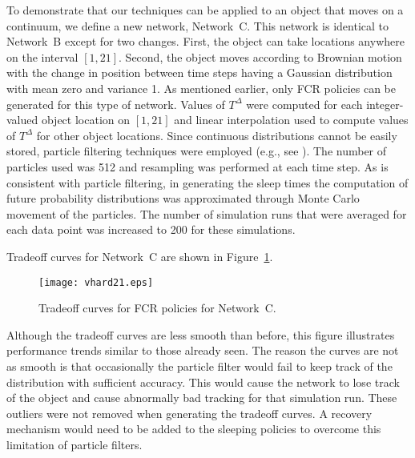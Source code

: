 \documentclass[journal,draftcls,onecolumn,11pt]{IEEEtran}
\begin{document}
To demonstrate that our techniques can be applied to an object that moves on a continuum, we define a new network, Network~C.  This network is identical to Network~B except for two changes.  First, the object can take locations anywhere on the interval $[1, 21]$.  Second, the object moves according to Brownian motion with the change in position between time steps having a Gaussian distribution with mean zero and variance 1.  As mentioned earlier, only FCR policies can be generated for this type of network.  Values of $T^\Delta$ were computed for each integer-valued object location on $[1,21]$ and linear interpolation used to compute values of $T^\Delta$ for other object locations.  Since continuous distributions cannot be easily stored, particle filtering techniques were employed (e.g., see \cite{doucet01}).  The number of particles used was 512 and resampling was performed at each time step.  As is consistent with particle filtering, in generating the sleep times the computation of future probability distributions was approximated through Monte Carlo movement of the particles.  The number of simulation runs that were averaged for each data point was increased to 200 for these simulations.

Tradeoff curves for Network~C are shown in Figure~\ref{fig:vhard21}.
\begin{figure}
   \begin{center}
      \texttt{[image: vhard21.eps]}
      \caption{Tradeoff curves for FCR policies for Network~C. \label{fig:vhard21}}
   \end{center}
\end{figure}
Although the tradeoff curves are less smooth than before, this figure illustrates performance trends similar to those already seen.  The reason the curves are not as smooth is that occasionally the particle filter would fail to keep track of the distribution with sufficient accuracy.  This would cause the network to lose track of the object and cause abnormally bad tracking for that simulation run.  These outliers were not removed when generating the tradeoff curves.  A recovery mechanism would need to be added to the sleeping policies to overcome this limitation of particle filters.
\end{document}
